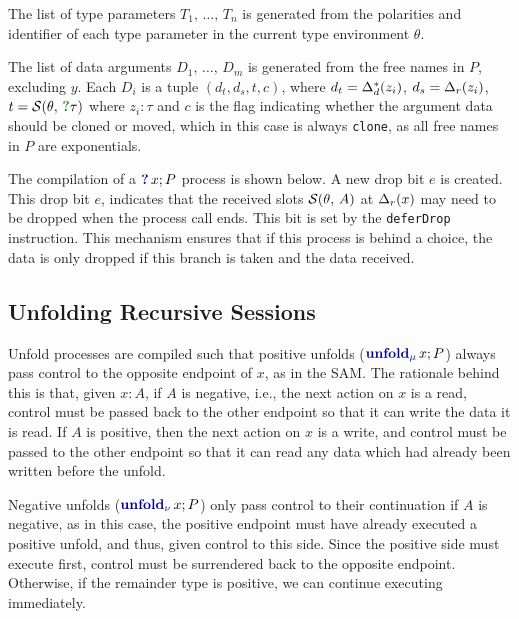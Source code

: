The list of type parameters $T_1,\,\dots,\,T_n$ is generated from the polarities and identifier of each type parameter in the current type environment $\theta$.

The list of data arguments $D_1,\,\dots,\,D_m$ is generated from the free names in $P$, excluding $y$. Each $D_i$ is a tuple $(d_t, d_s, t, c)$, where $d_t = \Delta^*_d(z_i)$, $d_s = \Delta_r(z_i)$, $t = \slots{\theta}{\whynott{\tau}}$ where $z_i: \tau$ and $c$ is the flag indicating whether the argument data should be cloned or moved, which in this case is always \texttt{clone}, as all free names in $P$ are exponentials.

The compilation of a $\whynotc{x}P$ process is shown below. A new drop bit $e$ is created. This drop bit $e$, indicates that the received slots $\mathcal{S}(\theta,\,A)$ at $\Delta_r(x)$ may need to be dropped when the process call ends. This bit is set by the \texttt{deferDrop} instruction. This mechanism ensures that if this process is behind a choice, the data is only dropped if this branch is taken and the data received.

\begin{compilation}{\theta}{\Delta}{}{}
     
\end{compilation}

\subsection{Unfolding Recursive Sessions}

Unfold processes are compiled such that positive unfolds ($\unfoldmuc{x}P$) always pass control to the opposite endpoint of $x$, as in the \ac{SAM}. The rationale behind this is that, given $x: A$, if $A$ is negative, i.e., the next action on $x$ is a read, control must be passed back to the other endpoint so that it can write the data it is read. If $A$ is positive, then the next action on $x$ is a write, and control must be passed to the other endpoint so that it can read any data which had already been written before the unfold.

Negative unfolds ($\unfoldnuc{x}{P}$) only pass control to their continuation if $A$ is negative, as in this case, the positive endpoint must have already executed a positive unfold, and thus, given control to this side. Since the positive side must execute first, control must be surrendered back to the opposite endpoint. Otherwise, if the remainder type is positive, we can continue executing immediately.


